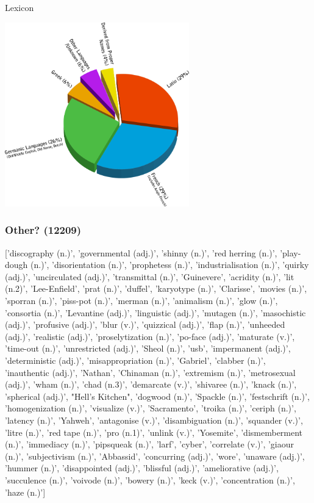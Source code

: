 \documentclass[10pt]{beamer}
\begin{document}
\begin{frame}[fragile]{Lexicon}

  \centerline{\includegraphics[width=8cm]{badchart.png}}

\end{frame}

\begin{frame}[fragile]
  \frametitle{Other? (12209)}

['discography (n.)', 'governmental (adj.)', 'shinny (n.)', 'red herring (n.)', 'play-dough (n.)', 'disorientation (n.)', 'prophetess (n.)', 'industrialisation (n.)', 'quirky (adj.)', 'uncirculated (adj.)', 'transmittal (n.)', 'Guinevere', 'acridity (n.)', 'lit (n.2)', 'Lee-Enfield', 'prat (n.)', 'duffel', 'karyotype (n.)', 'Clarisse', 'movies (n.)', 'sporran (n.)', 'piss-pot (n.)', 'merman (n.)', 'animalism (n.)', 'glow (n.)', 'consortia (n.)', 'Levantine (adj.)', 'linguistic (adj.)', 'mutagen (n.)', 'masochistic (adj.)', 'profusive (adj.)', 'blur (v.)', 'quizzical (adj.)', 'flap (n.)', 'unheeded (adj.)', 'realistic (adj.)', 'proselytization (n.)', 'po-face (adj.)', 'maturate (v.)', 'time-out (n.)', 'unrestricted (adj.)', 'Sheol (n.)', 'usb', 'impermanent (adj.)', 'deterministic (adj.)', 'misappropriation (n.)', 'Gabriel', 'clabber (n.)', 'inauthentic (adj.)', 'Nathan', 'Chinaman (n.)', 'extremism (n.)', 'metrosexual (adj.)', 'wham (n.)', 'chad (n.3)', 'demarcate (v.)', 'shivaree (n.)', 'knack (n.)', 'spherical (adj.)', "Hell's Kitchen", 'dogwood (n.)', 'Spackle (n.)', 'festschrift (n.)', 'homogenization (n.)', 'visualize (v.)', 'Sacramento', 'troika (n.)', 'ceriph (n.)', 'latency (n.)', 'Yahweh', 'antagonise (v.)', 'disambiguation (n.)', 'squander (v.)', 'litre (n.)', 'red tape (n.)', 'pro (n.1)', 'unlink (v.)', 'Yosemite', 'dismemberment (n.)', 'immediacy (n.)', 'pipsqueak (n.)', 'larf', 'cyber', 'correlate (v.)', 'giaour (n.)', 'subjectivism (n.)', 'Abbassid', 'concurring (adj.)', 'wore', 'unaware (adj.)', 'hummer (n.)', 'disappointed (adj.)', 'blissful (adj.)', 'ameliorative (adj.)', 'succulence (n.)', 'voivode (n.)', 'bowery (n.)', 'keck (v.)', 'concentration (n.)', 'haze (n.)']

\end{frame}
\end{document}
